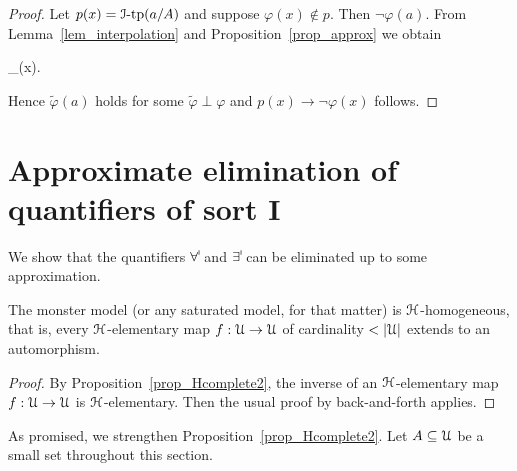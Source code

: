\documentclass[10pt,oneside]{amsproc}
\begin{document}
 \begin{proof}
  Let $p(x)={\EuScript I}\mbox{-tp}(a/A)$ and suppose $\varphi(x)\notin p$.
  Then $\neg\varphi(a)$.
  From Lemma~\ref{lem_interpolation} and Proposition~\ref{prop_approx} we obtain

  {\rightarrow}
  {\bigvee_{\tilde{\varphi}\perp\varphi}\tilde{\varphi}(x).}

  Hence $\tilde{\varphi}(a)$ holds for some $\tilde{\varphi}\perp\varphi$ and $p(x)\rightarrow\neg\varphi(x)$ follows.
 \end{proof}








\section{Approximate elimination of quantifiers of sort \textsf{I}}

We show that the quantifiers $\forall\raisebox{1.1ex}{\scaleto{\sf I}{.8ex}\kern-.2ex}$ and $\exists\raisebox{1.1ex}{\scaleto{\sf I}{.8ex}\kern-.2ex}$ can be eliminated up to some approximation.

\begin{proposition}
  The monster model (or any saturated model, for that matter) is ${\EuScript H}$-homogeneous, that is, every ${\EuScript H}$-elementary map $f:{\EuScript U}\to{\EuScript U}$ of cardinality $<|{\EuScript  U}|$ extends to an automorphism.
\end{proposition}

\begin{proof}
  By Proposition~\ref{prop_Hcomplete2}, the inverse of an ${\EuScript H}$-elementary map $f:{\EuScript U}\to{\EuScript U}$ is ${\EuScript H}$-elementary.
  Then the usual proof by back-and-forth applies.
\end{proof}

As promised, we strengthen Proposition~\ref{prop_Hcomplete2}.
Let $A\subseteq{\EuScript U}$ be a small set throughout this section.
\end{document}

